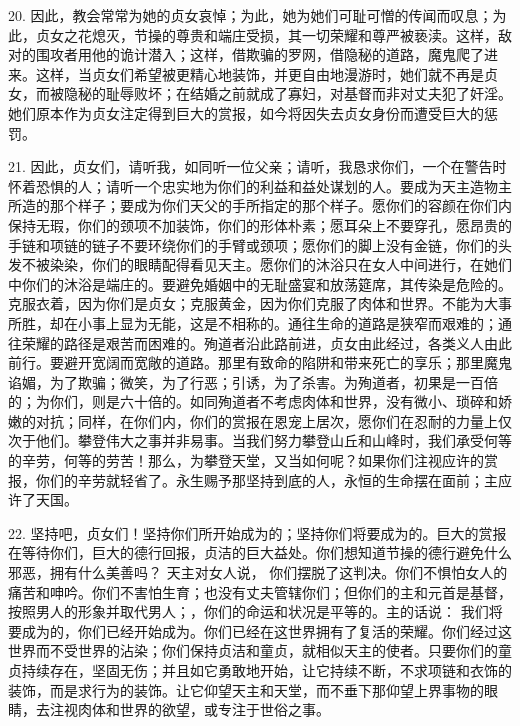 20. 因此，教会常常为她的贞女哀悼；为此，她为她们可耻可憎的传闻而叹息；为此，贞女之花熄灭，节操的尊贵和端庄受损，其一切荣耀和尊严被亵渎。这样，敌对的围攻者用他的诡计潜入；这样，借欺骗的罗网，借隐秘的道路，魔鬼爬了进来。这样，当贞女们希望被更精心地装饰，并更自由地漫游时，她们就不再是贞女，而被隐秘的耻辱败坏；在结婚之前就成了寡妇，对基督而非对丈夫犯了奸淫。她们原本作为贞女注定得到巨大的赏报，如今将因失去贞女身份而遭受巨大的惩罚。\par

21. 因此，贞女们，请听我，如同听一位父亲；请听，我恳求你们，一个在警告时怀着恐惧的人；请听一个忠实地为你们的利益和益处谋划的人。要成为天主造物主所造的那个样子；要成为你们天父的手所指定的那个样子。愿你们的容颜在你们内保持无瑕，你们的颈项不加装饰，你们的形体朴素；愿耳朵上不要穿孔，愿昂贵的手链和项链的链子不要环绕你们的手臂或颈项；愿你们的脚上没有金链，你们的头发不被染染，你们的眼睛配得看见天主。愿你们的沐浴只在女人中间进行，在她们中你们的沐浴是端庄的。要避免婚姻中的无耻盛宴和放荡筵席，其传染是危险的。克服衣着，因为你们是贞女；克服黄金，因为你们克服了肉体和世界。不能为大事所胜，却在小事上显为无能，这是不相称的。通往生命的道路是狭窄而艰难的；通往荣耀的路径是艰苦而困难的。殉道者沿此路前进，贞女由此经过，各类义人由此前行。要避开宽阔而宽敞的道路。那里有致命的陷阱和带来死亡的享乐；那里魔鬼谄媚，为了欺骗；微笑，为了行恶；引诱，为了杀害。为殉道者，初果是一百倍的；为你们，则是六十倍的。如同殉道者不考虑肉体和世界，没有微小、琐碎和娇嫩的对抗；同样，在你们内，你们的赏报在恩宠上居次，愿你们在忍耐的力量上仅次于他们。攀登伟大之事并非易事。当我们努力攀登山丘和山峰时，我们承受何等的辛劳，何等的劳苦！那么，为攀登天堂，又当如何呢？如果你们注视应许的赏报，你们的辛劳就轻省了。永生赐予那坚持到底的人，永恒的生命摆在面前；主应许了天国。\par

22. 坚持吧，贞女们！坚持你们所开始成为的；坚持你们将要成为的。巨大的赏报在等待你们，巨大的德行回报，贞洁的巨大益处。你们想知道节操的德行避免什么邪恶，拥有什么美善吗？ 天主对女人说，  你们摆脱了这判决。你们不惧怕女人的痛苦和呻吟。你们不害怕生育；也没有丈夫管辖你们；但你们的主和元首是基督，按照男人的形象并取代男人；，你们的命运和状况是平等的。主的话说：  我们将要成为的，你们已经开始成为。你们已经在这世界拥有了复活的荣耀。你们经过这世界而不受世界的沾染；你们保持贞洁和童贞，就相似天主的使者。只要你们的童贞持续存在，坚固无伤；并且如它勇敢地开始，让它持续不断，不求项链和衣饰的装饰，而是求行为的装饰。让它仰望天主和天堂，而不垂下那仰望上界事物的眼睛，去注视肉体和世界的欲望，或专注于世俗之事。\par

